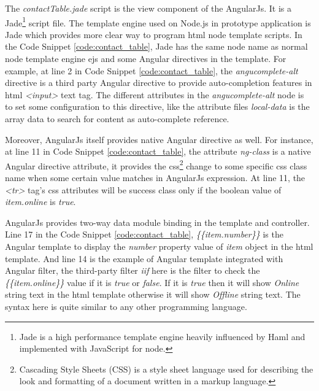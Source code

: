 \par The \textit{contactTable.jade} script is the view component of the AngularJs. It is a Jade\footnote{Jade is a high performance template engine heavily influenced by Haml and implemented with JavaScript for node.\cite{github:jade}} script file. The template engine used on Node.js in prototype application is Jade which provides more clear way to program \gls{html} node template scripts. In the Code Snippet \ref{code:contact_table}, Jade has the same node name as normal node template engine \gls{ejs} and some Angular directives in the template. For example, at line 2 in Code Snippet \ref{code:contact_table}, the \textit{angucomplete-alt} directive is a third party Angular directive to provide auto-completion features in \gls{html} \textit{<input>} text tag. The different attributes in the \textit{angucomplete-alt} node is to set some configuration to this directive, like the attribute files \textit{local-data} is the array data to search for content as auto-complete reference.

\par Moreover, AngularJs itself provides native Angular directive as well. For instance, at line 11 in Code Snippet \ref{code:contact_table}, the attribute \textit{ng-class} is a native Angular directive attribute, it provides the \gls{css}\footnote{Cascading Style Sheets (CSS) is a style sheet language used for describing the look and formatting of a document written in a markup language.\cite{wiki:css}} change to some specific \gls{css} class name when some certain value matches in AngularJs expression. At line 11, the \textit{<tr>} tag's \gls{css} attributes will be success class only if the boolean value of \textit{item.online} is \textit{true}.

\par AngularJs provides two-way data module binding in the template and controller. Line 17 in the Code Snippet \ref{code:contact_table}, \textit{\{\{item.number\}\}} is the Angular template to display the \textit{number} property value of \textit{item} object in the \gls{html} template. And line 14 is the example of Angular template integrated with Angular filter, the third-party filter \textit{iif} here is the filter to check the \textit{\{\{item.online\}\}} value if it is \textit{true} or \textit{false}. If it is \textit{true} then it will show \textit{Online} string text in the \gls{html} template otherwise it will show \textit{Offline} string text. The syntax here is quite similar to any other programming language.

